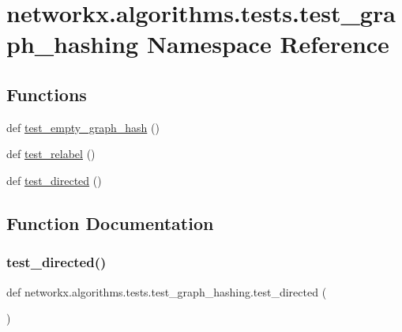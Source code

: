 \hypertarget{namespacenetworkx_1_1algorithms_1_1tests_1_1test__graph__hashing}{}\section{networkx.\+algorithms.\+tests.\+test\+\_\+graph\+\_\+hashing Namespace Reference}
\label{namespacenetworkx_1_1algorithms_1_1tests_1_1test__graph__hashing}
\subsection*{Functions}
\begin{DoxyCompactItemize}
\item 
def \hyperlink{namespacenetworkx_1_1algorithms_1_1tests_1_1test__graph__hashing_a940476dee67f72027296cb7dde27f352}{test\+\_\+empty\+\_\+graph\+\_\+hash} ()
\item 
def \hyperlink{namespacenetworkx_1_1algorithms_1_1tests_1_1test__graph__hashing_a014d8d53b304cfb986a39b83c863de04}{test\+\_\+relabel} ()
\item 
def \hyperlink{namespacenetworkx_1_1algorithms_1_1tests_1_1test__graph__hashing_a6feedd5725fbccb49a6a797fd3b42835}{test\+\_\+directed} ()
\end{DoxyCompactItemize}


\subsection{Function Documentation}
\mbox{\label{namespacenetworkx_1_1algorithms_1_1tests_1_1test__graph__hashing_a6feedd5725fbccb49a6a797fd3b42835}} 
\subsubsection{\texorpdfstring{test\+\_\+directed()}{test\_directed()}}
{\footnotesize\ttfamily def networkx.\+algorithms.\+tests.\+test\+\_\+graph\+\_\+hashing.\+test\+\_\+directed (\begin{DoxyParamCaption}{ }\end{DoxyParamCaption})}

